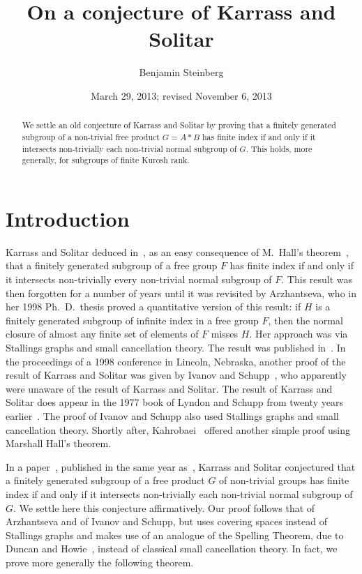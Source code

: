 \documentclass[11pt,reqno]{amsart}
\title{On a conjecture of Karrass and Solitar}
\author{Benjamin Steinberg}
\date{March 29, 2013; revised November 6, 2013}
\begin{document}
\begin{abstract}
We settle an old conjecture of Karrass and Solitar by proving that a finitely generated subgroup of
a non-trivial free product $G = A\ast B$ has finite index if and only if it
intersects non-trivially each non-trivial normal subgroup of $G$. This holds, more generally, for subgroups of finite Kurosh rank.
\end{abstract}

\maketitle

\section{Introduction}
Karrass and Solitar deduced in~\cite{KS1}, as an easy consequence of
M.~Hall's theorem~\cite{Hall2}, that a finitely generated subgroup of
a free group $F$ has finite index if and only if it intersects
non-trivially every non-trivial normal subgroup of $F$. This result was then forgotten for a number of years until it was revisited by Arzhantseva, who in her 1998 Ph.~D.\ thesis proved a quantitative version of this result: if $H$ is a finitely generated subgroup of infinite
index in a free group $F$, then the normal closure of almost any finite set of elements of $F$ misses $H$. Her approach was via Stallings graphs and small cancellation theory. The result was published in~\cite{Goulnara}.
In the proceedings of a 1998 conference in Lincoln, Nebraska, another proof of the result of Karrass and Solitar was given by  Ivanov and Schupp~\cite{IS}, who apparently were unaware of the result of Karrass and Solitar. The result of Karrass and Solitar does appear in the 1977 book of Lyndon and Schupp from twenty years earlier~\cite[Chapter~1, Proposition~3.17]{LyndonandSchupp}.  The proof of Ivanov and Schupp also used Stallings graphs and small cancellation theory.  Shortly after, Kahrobaei~\cite{Delaram} offered another simple proof using Marshall Hall's theorem.

In a paper~\cite{KS2}, published in the same year as~\cite{KS1}, Karrass and Solitar conjectured that a finitely generated subgroup of a free product $G$ of non-trivial
groups has finite index if and only
if it intersects non-trivially each non-trivial normal subgroup of $G$.  We settle here this conjecture affirmatively.  Our proof follows that of Arzhantseva and of Ivanov and Schupp, but uses covering spaces instead of Stallings graphs and makes use of an analogue of the Spelling Theorem, due to Duncan and Howie~\cite{DuncanHowie}, instead of classical small cancellation theory. In fact, we prove more generally the following theorem.
\end{document}
